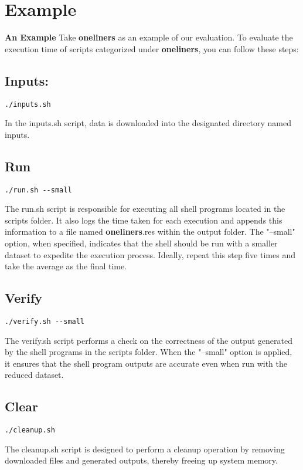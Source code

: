 \documentclass[sigplan, screen, 10pt]{acmart}
\begin{document}
\section{Example}
\label{ex}

\textbf{An Example}
Take \textbf{oneliners} as an example of our evaluation. To evaluate the execution time of scripts categorized under \textbf{oneliners}, you can follow these steps:
\subsection{Inputs:}
\begin{verbatim}
./inputs.sh
\end{verbatim}
In the inputs.sh script, data is downloaded into the designated directory named inputs.
\subsection{Run}
\begin{verbatim}
./run.sh --small
\end{verbatim}
The run.sh script is responsible for executing all shell programs located in the scripts folder. It also logs the time taken for each execution and appends this information to a file named \textbf{oneliners}.res within the output folder. The "--small" option, when specified, indicates that the shell should be run with a smaller dataset to expedite the execution process. Ideally, repeat this step five times and take the average as the final time.
\subsection{Verify}
\begin{verbatim}
./verify.sh --small
\end{verbatim}
The verify.sh script performs a check on the correctness of the output generated by the shell programs in the scripts folder. When the "--small" option is applied, it ensures that the shell program outputs are accurate even when run with the reduced dataset.
\subsection{Clear}
\begin{verbatim}
./cleanup.sh
\end{verbatim}
The cleanup.sh script is designed to perform a cleanup operation by removing downloaded files and generated outputs, thereby freeing up system memory.
\end{document}

